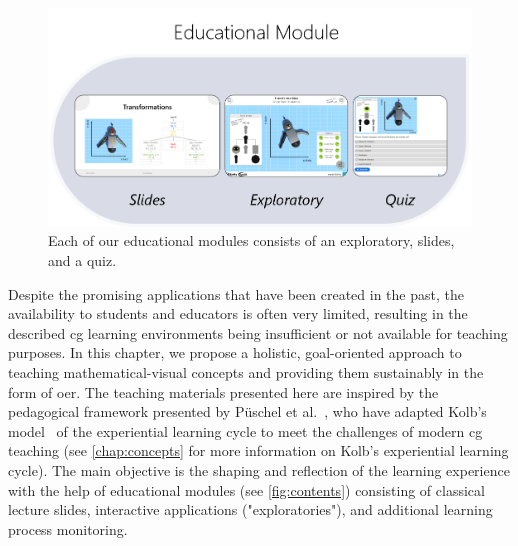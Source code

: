\begin{figure}[tbh]
	\centering
	\includegraphics[width=0.8\linewidth]{pictures/ExGoerContents.png}
	\captionsetup{labelfont=bf,textfont=it}
	\caption[Contents of educational modules.]{Each of our educational modules consists of an exploratory, slides, and a quiz.\label{fig:contents}}
\end{figure}
Despite the promising applications that have been created in the past, the availability to students and educators is often very limited, resulting in the described \acrshort{cg} learning environments being insufficient or not available for teaching purposes. In this chapter, we propose a holistic, goal-oriented approach to teaching mathematical-visual concepts and providing them sustainably in the form of \acrshort{oer}. The teaching materials presented here are inspired by the pedagogical framework presented by Püschel et al.~\cite{pueschel:2013:MRCG}, who have adapted Kolb's model~\cite{kolb:1984:experiential} of the experiential learning cycle to meet the challenges of modern \acrshort{cg} teaching (see \autoref{chap:concepts} for more information on Kolb's experiential learning cycle). The main objective is the shaping and reflection of the learning experience with the help of educational modules (see \autoref{fig:contents}) consisting of classical lecture slides, interactive applications ("exploratories"), and additional learning process monitoring.

